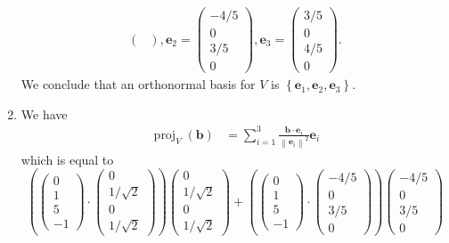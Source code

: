 \documentclass[12pt]{article}
\begin{document}
\begin{enumerate}[label=\textbf{(\alph*)}]
\begin{align*}
\begin{pmatrix}
    \end{pmatrix},\mathbf{e}_2=\begin{pmatrix}
        -4/5 \\ 0\\3/5 \\ 0
    \end{pmatrix},\mathbf{e}_3=\begin{pmatrix}
        3/5 \\ 0\\4/5 \\ 0
    \end{pmatrix}.
\end{align*}
We conclude that an orthonormal basis for $V$ is $\left\{\mathbf{e}_1,\mathbf{e}_2,\mathbf{e}_3\right\}$.
\item We have \begin{align*}
    \operatorname{proj}_V\left(\mathbf{b}\right)&=\sum_{i=1}^{3}\frac{\mathbf{b}\cdot \mathbf{e}_i}{\left\|\mathbf{e}_i\right\|^2}\mathbf{e}_i\end{align*}
which is equal to \[\left(\begin{pmatrix}
        0\\1\\5\\-1
    \end{pmatrix}\cdot \begin{pmatrix}
        0 \\ 1/\sqrt{2} \\ 0\\ 1/\sqrt{2}
    \end{pmatrix}\right)\begin{pmatrix}
        0 \\ 1/\sqrt{2} \\ 0\\ 1/\sqrt{2}
    \end{pmatrix}+\left(\begin{pmatrix}
        0\\1\\5\\-1
    \end{pmatrix}\cdot \begin{pmatrix}
        -4/5 \\ 0 \\3/5 \\ 0
    \end{pmatrix}\right)\begin{pmatrix}
        -4/5 \\ 0 \\3/5 \\ 0

\end{pmatrix}\]
\end{enumerate}
\end{document}
